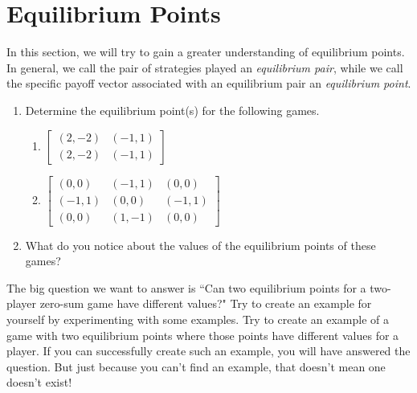 
\section{Equilibrium Points}



\vspace{.1in}
In this section, we will try to gain a greater understanding of equilibrium points. In general, we call the pair of strategies played an {\it equilibrium pair}, while we call the specific payoff vector associated with an equilibrium pair an {\it equilibrium point}.

\begin{enumerate}
\item Determine the equilibrium point(s) for the following games.
\begin{enumerate}
\item 
$\left[\begin{matrix}
(2, -2)&(-1, 1)\\
(2, -2)&(-1, 1)

\end{matrix}\right]$

\item 
$\left[\begin{matrix}
(0, 0)&(-1, 1)&(0, 0)\\
(-1, 1)&(0, 0)&(-1, 1)\\
(0, 0)&(1, -1)&(0, 0)

\end{matrix}\right]$
\vspace{.1in}
\end{enumerate}

\item What do you notice about the values of the equilibrium points of these games?
\vspace{.1in}

\end{enumerate}

The big question we want to answer is ``Can two equilibrium points for a two-player zero-sum game have different values?" Try to create an example for yourself by experimenting with some examples. Try to create an example of a game with two equilibrium points where those points have different values for a player. If you can successfully create such an example, you will have answered the question. But just because you can't find an example, that doesn't mean one doesn't exist! 

